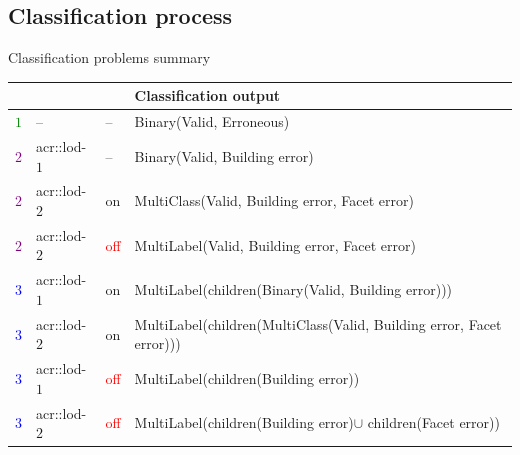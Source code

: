 \documentclass[export]{beamer}
\begin{document}
        \subsection{Classification process}
            \begin{frame}{Classification problems summary}
                \begin{table}
                    \tiny
                    \begin{center}
                        \begin{tabular}{x{.05\textwidth} x{.06\textwidth} x{.05\textwidth} x{.7\textwidth}}
                            \toprule
                             &  &  & \textbf{Classification output}\\
                            \midrule
                            \scriptsize
                            \textcolor{green}{$1$} & -- & -- & Binary(Valid, Erroneous)\\
                            \textcolor{purple}{$2$} & \acrshort{acr::lod}-$1$ & -- & Binary(Valid, Building error)\\
                            \textcolor{purple}{$2$} & \acrshort{acr::lod}-$2$ & \textcolor{IGNDarkGreen}{on} & MultiClass(Valid, Building error, Facet error)\\
                            \textcolor{purple}{$2$} & \acrshort{acr::lod}-$2$ & \textcolor{red}{off} & MultiLabel(Valid, Building error, Facet error)\\
                            \textcolor{blue}{$3$} & \acrshort{acr::lod}-$1$ & \textcolor{IGNDarkGreen}{on} & MultiLabel(children(Binary(Valid, Building error)))\\
                            \textcolor{blue}{$3$} & \acrshort{acr::lod}-$2$ & \textcolor{IGNDarkGreen}{on} & MultiLabel(children(MultiClass(Valid, Building error, Facet error)))\\
                            \textcolor{blue}{$3$} & \acrshort{acr::lod}-$1$ & \textcolor{red}{off} & MultiLabel(children(Building error))\\
                            \textcolor{blue}{$3$} & \acrshort{acr::lod}-$2$ & \textcolor{red}{off} & MultiLabel(children(Building error)$\cup$ children(Facet error))\\
                            \bottomrule
                        \end{tabular}
                    \end{center}
                \end{table}
            \end{frame}
\end{document}
